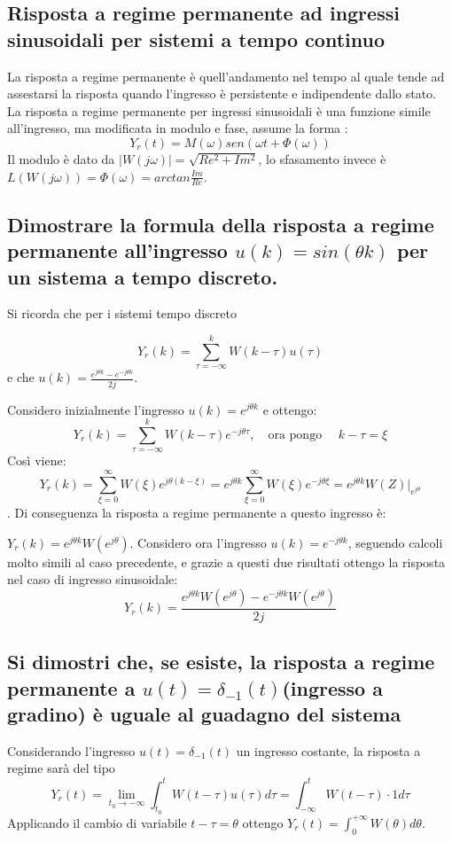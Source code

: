 \documentclass{article}
\begin{document}
\subsection{Risposta a regime permanente ad ingressi sinusoidali per sistemi a tempo continuo}
La risposta a regime permanente è quell'andamento
nel tempo al quale tende ad assestarsi la risposta
quando l'ingresso è persistente e indipendente dallo stato.
La risposta a regime permanente per ingressi sinusoidali
è una funzione simile all'ingresso, ma modificata in modulo e fase, assume la forma :
\[ Y_r(t)=M(\omega)sen(\omega t + \Phi(\omega))\]
Il modulo è dato da $|W(j\omega)|=\sqrt{Re^2+Im^2}$,
lo sfasamento invece è $ L(W(j\omega))=\Phi(\omega)=arctan \frac{Im}{Re}$.


\subsection{\boldmath Dimostrare la formula della risposta a regime permanente all'ingresso $u(k) = sin(\theta k)$ per un sistema a tempo discreto.}
Si ricorda che per i sistemi tempo discreto

\[Y_r(k)=\sum_{\tau =- \infty}^{k} W(k-\tau)u(\tau)\]e che $u(k)=\frac {e^{j\theta k} - e^{-j\theta k}}{2j} $.


Considero inizialmente l'ingresso $u(k)=e^{j \theta k}$ e ottengo:
\[ 
    Y_r(k)=\sum_{\tau =- \infty}^{k} W(k-\tau)e^{-j\theta \tau}, \quad \text{ora pongo }\quad k-\tau=\xi
\]
Così viene:
\[ Y_r(k)=\sum_{\xi =0}^{\infty} W(\xi)e^{j\theta (k-\xi)} = e^{j\theta k} \sum_{\xi =0}^{\infty} W(\xi)e^{-j\theta \xi}
= e^{j\theta k} W(Z)|_{e^{j \theta}} \].
Di conseguenza la risposta a regime permanente a questo ingresso è:

$Y_r(k)=e^{j \theta k}W(e^{j \theta})$.
Considero ora l'ingresso $u(k)=e^{-j \theta k}$, seguendo calcoli molto simili al caso precedente,
e grazie a questi due risultati ottengo la risposta
nel caso di ingresso sinusoidale:
\[
    Y_r(k)=\frac{e^{j \theta k}W(e^{j \theta})-e^{-j \theta k}W(e^{j \theta})}{2j}
\]
\subsection{\boldmath Si dimostri che, se esiste, la risposta a regime permanente a $u(t) = \delta _{-1}(t)$(ingresso a gradino) è uguale al guadagno del sistema}
Considerando l'ingresso $u(t) = \delta_{-1}(t)$ un ingresso costante,
la risposta a regime sarà del tipo 
\[ 
    Y_r(t)= \lim_{t_0 \to -\infty} \int_{t_0}^{t}W(t-\tau)u(\tau)d\tau=\int_{-\infty}^{t}W(t-\tau)\cdot 1 d\tau
\]
Applicando il cambio di variabile $t-\tau = \theta$ ottengo $Y_r(t)=\int_{0}^{+\infty}W(\theta) d\theta$.
\end{document}
